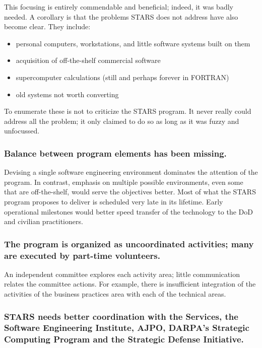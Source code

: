 \documentclass[11pt,final]{article}
\begin{document}
This focusing is entirely commendable and beneficial; indeed, it was badly
needed. A corollary is that the problems STARS does not address have also
become clear. They include:

\begin{itemize}
    \item personal computers, workstations, and little software systems built on them
    \item acquisition of off-the-shelf commercial software
    \item supercomputer calculations (still and perhaps forever in FORTRAN)
    \item old systems not worth converting
\end{itemize}

To enumerate these is not to criticize the STARS program. It never really could
address all the problem; it only claimed to do so as long as it was fuzzy and
unfocussed.

\subsubsection*{Balance between program elements has been missing.}

Devising a single software engineering environment dominates the attention of
the program. In contrast, emphasis on multiple possible environments, even some
that are off-the-shelf, would serve the objectives better. Most of what the
STARS program proposes to deliver is scheduled very late in its lifetime. Early
operational milestones would better speed transfer of the technology to the DoD
and civilian practitioners.

\subsubsection*{The program is organized as uncoordinated activities; many are executed
by part-time volunteers.}

An independent committee explores each activity area; little communication
relates the committee actions. For example, there is insufficient integration
of the activities of the business practices area with each of the technical
areas.

\subsubsection*{STARS needs better coordination with the Services, the Software
Engineering Institute, AJPO, DARPA’s Strategic Computing Program and the
Strategic Defense Initiative.}
\end{document}
